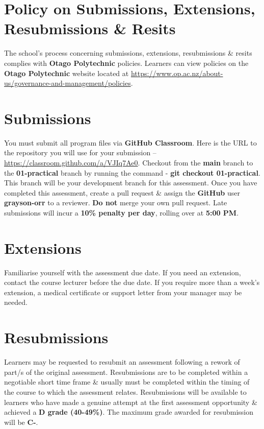 \documentclass{article}
\begin{document}
\section*{Policy on Submissions, Extensions, Resubmissions \& Resits}
The school's process concerning submissions, extensions, resubmissions \& resits complies with \textbf{Otago Polytechnic} policies. Learners can view policies on the \textbf{Otago Polytechnic} website located at \href{https://www.op.ac.nz/about-us/governance-and-management/policies}{https://www.op.ac.nz/about-us/governance-and-management/policies}.

\section*{Submissions}
You must submit all program files via \textbf{GitHub Classroom}. Here is the URL to the repository you will use for your submission – \href{https://classroom.github.com/a/VJIq7Ae0}{https://classroom.github.com/a/VJIq7Ae0}. Checkout from the \textbf{main} branch to the \textbf{01-practical} branch by running the command - \textbf{git checkout 01-practical}. This branch will be your development branch for this assessment. Once you have completed this assessment, create a pull request \& assign the \textbf{GitHub} user \textbf{grayson-orr} to a reviewer. \textbf{Do not} merge your own pull request. Late submissions will incur a \textbf{10\% penalty per day}, rolling over at \textbf{5:00 PM}.

\section*{Extensions}
Familiarise yourself with the assessment due date. If you need an extension, contact the course lecturer before the due date. If you require more than a week's extension, a medical certificate or support letter from your manager may be needed.

\section*{Resubmissions}
Learners may be requested to resubmit an assessment following a rework of part/s of the original assessment. Resubmissions are to be completed within a negotiable short time frame \& usually must be completed within the timing of the course to which the assessment relates. Resubmissions will be available to learners who have made a genuine attempt at the first assessment opportunity \& achieved a \textbf{D grade (40-49\%)}. The maximum grade awarded for resubmission will be \textbf{C-}.
\end{document}

